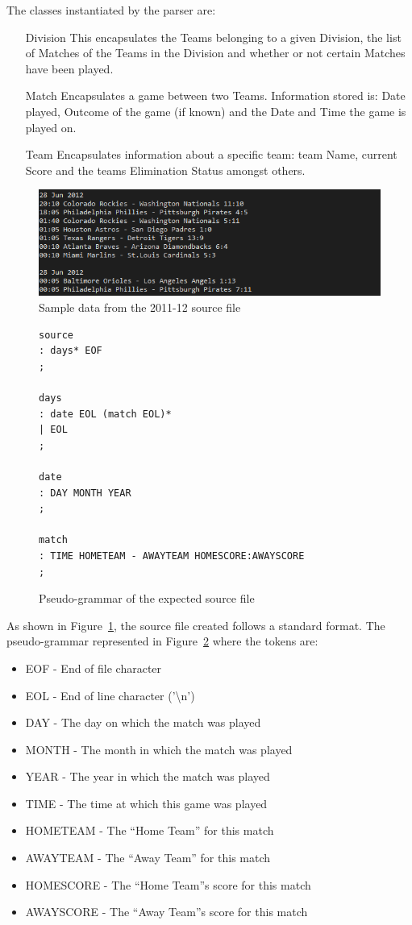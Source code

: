 The classes instantiated by the parser are:
\begin{itemize}
  \item[Division] This encapsulates the Teams belonging to a given
    Division, the list of Matches of the Teams in the Division and
    whether or not certain Matches have been played.
  \item[Match] Encapsulates a game between two Teams. Information
    stored is: Date played, Outcome of the game (if known) and the
    Date and Time the game is played on.
  \item[Team] Encapsulates information about a specific team: team
    Name, current Score and the teams Elimination Status amongst
    others. 
\end{itemize}
\pagebreak
\begin{figure}[h]
  \includegraphics[width=\linewidth,keepaspectratio]{images/sourceFileExample.png}
  \caption{Sample data from the 2011-12 source file}\label{fig:BASESRC}
\end{figure}
\begin{figure}[h]
\begin{verbatim}
source
: days* EOF
;

days
: date EOL (match EOL)*
| EOL
;

date
: DAY MONTH YEAR
;

match
: TIME HOMETEAM - AWAYTEAM HOMESCORE:AWAYSCORE
;
\end{verbatim}

\caption{Pseudo-grammar of the expected source file}\label{fig:GRAMMAR}
\end{figure}
As shown in Figure~\ref{fig:BASESRC}, the source file created follows
a standard format. The pseudo-grammar represented in
Figure~\ref{fig:GRAMMAR} where the tokens are:
\begin{itemize}
\item EOF -  End of file character
\item EOL - End of line character ('\textbackslash n')
\item DAY - The day on which the match was played
\item MONTH - The month in which the match was played
\item YEAR - The year in which the match was played
\item TIME - The time at which this game was played
\item HOMETEAM - The ``Home Team'' for this match
\item AWAYTEAM - The ``Away Team'' for this match
\item HOMESCORE - The ``Home Team''s score for this match
\item AWAYSCORE - The ``Away Team''s score for this match
\end{itemize}

